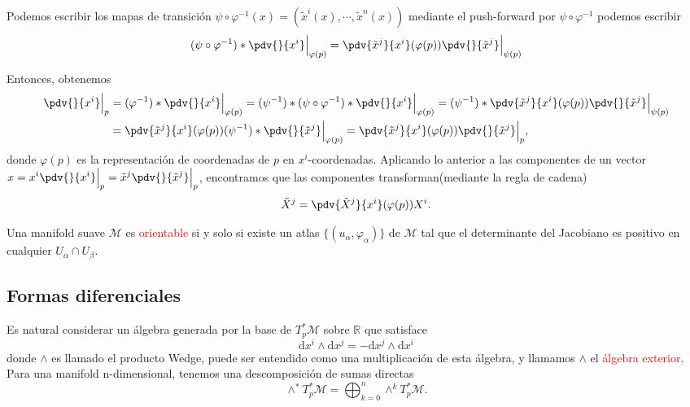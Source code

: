 \documentclass[../main]{subfiles}
\begin{document}
Podemos escribir los mapas de transición $\psi \circ \varphi^{-1}(x)=\left(\tilde{x}^{i}(x), \cdots, \tilde{x}^{n}(x)\right)$ mediante el push-forward por $\psi \circ \varphi^{-1}$ podemos escribir 
\begin{equation}
    (\psi \circ \varphi^{-1}) *\pdv{}{x^{i}}\Big{|}_{\varphi(p)}=\pdv{\tilde{x}^{j}}{x^{i}}(\varphi(p))\pdv{}{\tilde{x}^{j}}\Big{|}_{\psi(p)}
\end{equation}

Entonces, obtenemos 
\begin{equation}
    \begin{split}
        \pdv{}{x^{i}}\Big{|}_p&=(\varphi^{-1}) * \pdv{}{x^{i}}\Big{|}_{\varphi(p)}=(\psi^{-1})*(\psi \circ \varphi^{-1})*\pdv{}{x^{i}}\Big{|}_{\varphi(p)}=(\psi^{-1})*\pdv{\tilde{x}^{j}}{x^{i}}(\varphi(p))\pdv{}{\tilde{x}^j}\Big{|}_{\psi(p)}\\
        &=\pdv{\tilde{x}^j}{x^{i}}(\varphi(p))(\psi^{-1})*\pdv{}{\tilde{x}^j}\Big{|}_{\varphi(p)}=\pdv{\tilde{x}^j}{x^{i}}(\varphi(p))\pdv{}{\tilde{x}^j}\Big{|}_p,
    \end{split}
\end{equation}
donde $\varphi(p)$ es la representación de coordenadas de $p$ en $x^{i}$-coordenadas. Aplicando lo anterior a las componentes de un vector $\displaystyle x=x^{i}\pdv{}{x^{i}}\Big{|}_p=\tilde{x}^j\pdv{}{\tilde{x}^j}\Big{|}_p$, encontramos que las componentes transforman(mediante la regla de cadena)
\begin{equation}
    \tilde{X}^j=\pdv{\tilde{X}^j}{x^{i}}(\varphi(p))X^{i}.
\end{equation}

Una manifold suave $\mathcal{M}$ es \textcolor{red}{orientable} si y solo si existe un atlas $\{ (u_{\alpha}, \varphi_{\alpha})\}$ de $\mathcal{M}$ tal que el determinante del Jacobiano es positivo en cualquier $U_{\alpha} \cap U_{\beta}$.


\subsection{Formas diferenciales}
Es natural considerar un álgebra generada por la base de $T^{*}_p \mathcal{M}$ sobre $\mathbb{R}$ que satisface 
\begin{equation}
    \mathrm{d}x^{i} \wedge \mathrm{d}x^j=-\mathrm{d}x^j \wedge \mathrm{d}x^{i}
\end{equation}
donde $\wedge$ es llamado el producto Wedge, puede ser entendido como una multiplicación de esta álgebra, y llamamos $\wedge$ el \textcolor{red}{álgebra exterior}. Para una manifold n-dimensional, tenemos una descomposición de sumas directas
\begin{equation}
    \wedge^{*}T^{*}_p \mathcal{M}=\bigoplus_{k=0}^n \wedge^k T^{*}_p \mathcal{M}.
\end{equation}
\end{document}
